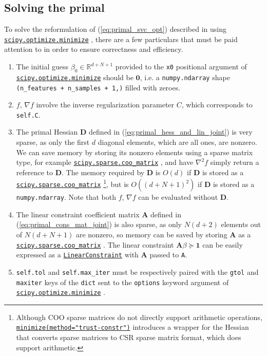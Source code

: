 \documentclass{article}
\numberwithin{equation}{section}
\newcommand{\minimize}{%
    \href{%
        https://docs.scipy.org/doc/scipy/reference/generated/%
        scipy.optimize.minimize.html%
    }{\texttt{scipy.optimize.minimize}}%
}
\newcommand{\minimizetrustconstr}{%
    \href{%
        https://docs.scipy.org/doc/scipy/reference/optimize.%
        minimize-trustconstr.html%
    }{\texttt{minimize(method="trust-constr")}}%
}
\newcommand{\coomatrix}{%
    \href{%
        https://docs.scipy.org/doc/scipy/reference/generated/%
        scipy.sparse.coo_matrix.html%
    }{\texttt{scipy.sparse.coo\_matrix}}%
}
\newcommand{\LinearConstraint}{%
    \href{%
        https://docs.scipy.org/doc/scipy/reference/generated/%
        scipy.optimize.LinearConstraint.html%
    }{\texttt{LinearConstraint}}%
}
\begin{document}
\subsection{Solving the primal}

To solve the reformulation of (\ref{eq:primal_svc_opt}) described in
 using \minimize, there are a few particulars that
must be paid attention to in order to ensure correctness and efficiency.

\medskip

\begin{enumerate}
    \item
    The initial guess $ \beta_0 \in \mathbb{R}^{d + N + 1} $ provided to the
    \texttt{x0} positional argument of \minimize{} should be $ \mathbf{0} $,
    i.e. a \texttt{numpy.ndarray} shape
    \texttt{(n\_features + n\_samples + 1,)} filled with zeroes.

    \item
    $ f $, $ \nabla f $ involve the inverse regularization parameter $ C $,
    which corresponds to \texttt{self.C}.

    \item
    The primal Hessian $ \mathbf{D} $ defined in
    (\ref{eq:primal_hess_and_lin_joint}) is very sparse, as only the first
    $ d $ diagonal elements, which are all ones, are nonzero. We can save
    memory by storing its nonzero elements using a sparse matrix type, for
    example \coomatrix, and have $ \nabla^2 f $ simply return a reference to
    $ \mathbf{D} $. The memory required by $ \mathbf{D} $ is $ O(d) $ if
    $ \mathbf{D} $ is stored as a \coomatrix\footnote{
        Although COO sparse matrices do not directly support arithmetic
        operations, \minimizetrustconstr{} introduces a wrapper for the
        Hessian that converts sparse matrices to CSR sparse matrix format,
        which does support arithmetic.
    }, but is $ O((d + N + 1)^2) $ if $ \mathbf{D} $ is stored as a
    \texttt{numpy.ndarray}. Note that both $ f $, $ \nabla f $ can be
    evaluated without $ \mathbf{D} $.

    \item
    The linear constraint coefficient matrix $ \mathbf{A} $ defined in
    (\ref{eq:primal_cons_mat_joint}) is also sparse, as only $ N(d + 2) $
    elements out of $ N(d + N + 1) $ are nonzero, so memory can be saved by
    storing $ \mathbf{A} $ as a \coomatrix. The linear constraint
    $ \mathbf{A}\beta \succeq \mathbf{1} $ can be easily expressed as a
    \LinearConstraint{} with $ \mathbf{A} $ passed to \texttt{A}.

    \item
    \texttt{self.tol} and \texttt{self.max\_iter} must be respectively paired
    with the \texttt{gtol} and \texttt{maxiter} keys of the \texttt{dict} sent
    to the \texttt{options} keyword argument of \minimize.
\end{enumerate}
\end{document}
